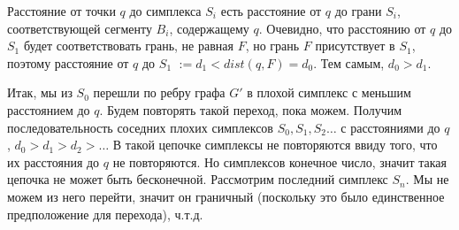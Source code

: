 \documentclass{article}
\begin{document}
        Расстояние от точки $q$ до симплекса $S_i$ есть расстояние от $q$ до грани $S_i$, соответствующей сегменту $B_i$, содержащему $q$. Очевидно, что расстоянию от $q$ до $S_1$ будет соответствовать грань, не равная $F$, но грань $F$ присутствует в $S_1$, поэтому расстояние от $q$ до $S_1$  $:= d_1 < dist(q, F) = d_0$. Тем самым, $d_0 > d_1$.
        
        Итак, мы из $S_0$ перешли по ребру графа $G'$ в плохой симплекс с меньшим расстоянием до $q$. Будем повторять такой переход, пока можем. Получим последовательность соседних плохих симплексов $S_0, S_1, S_2 \dots$ с расстояниями до $q$, $d_0 > d_1 > d_2 > \dots$ В такой цепочке симплексы не повторяются ввиду того, что их расстояния до $q$ не повторяются. Но симплексов конечное число, значит такая цепочка не может быть бесконечной. Рассмотрим последний симплекс $S_n$. Мы не можем из него перейти, значит он граничный (поскольку это было единственное предположение для перехода), ч.т.д.
        
      
    
        
              
         
	
\end{document}
